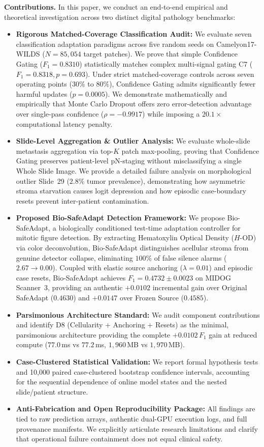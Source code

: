 \documentclass[conference]{IEEEtran}
\begin{document}
\textbf{Contributions.} In this paper, we conduct an end-to-end empirical and theoretical investigation across two distinct digital pathology benchmarks:
\begin{itemize}
    \item \textbf{Rigorous Matched-Coverage Classification Audit:} We evaluate seven classification adaptation paradigms across five random seeds on Camelyon17-WILDS ($N=85{,}054$ target patches). We prove that simple Confidence Gating ($F_1 = 0.8310$) statistically matches complex multi-signal gating C7 ($F_1 = 0.8318, p=0.693$). Under strict matched-coverage controls across seven operating points ($30\%$ to $80\%$), Confidence Gating admits significantly fewer harmful updates ($p=0.0005$). We demonstrate mathematically and empirically that Monte Carlo Dropout offers zero error-detection advantage over single-pass confidence ($\rho = -0.9917$) while imposing a $20.1\times$ computational latency penalty.
    \item \textbf{Slide-Level Aggregation \& Outlier Analysis:} We evaluate whole-slide metastasis aggregation via top-$K$ patch max-pooling, proving that Confidence Gating preserves patient-level pN-staging without misclassifying a single Whole Slide Image. We provide a detailed failure analysis on morphological outlier Slide~29 ($2.8\%$ tumor prevalence), demonstrating how asymmetric stroma starvation causes logit depression and how episodic case-boundary resets prevent inter-patient contamination.
    \item \textbf{Proposed Bio-SafeAdapt Detection Framework:} We propose Bio-SafeAdapt, a biologically conditioned test-time adaptation controller for mitotic figure detection. By extracting Hematoxylin Optical Density ($H\text{-OD}$) via color deconvolution, Bio-SafeAdapt distinguishes acellular stroma from genuine detector collapse, eliminating $100\%$ of false silence alarms ($2.67 \to 0.00$). Coupled with elastic source anchoring ($\lambda = 0.01$) and episodic case resets, Bio-SafeAdapt achieves $F_1 = 0.4732 \pm 0.0023$ on MIDOG Scanner~3, providing an authentic $+0.0102$ incremental gain over Original SafeAdapt ($0.4630$) and $+0.0147$ over Frozen Source ($0.4585$).
    \item \textbf{Parsimonious Architecture Standard:} We audit component contributions and identify D8 (Cellularity + Anchoring + Resets) as the minimal, parsimonious architecture providing the complete $+0.0102$\,$F_1$ gain at reduced compute ($77.0$\,ms vs $77.2$\,ms, $1{,}960$\,MB vs $1{,}970$\,MB).
    \item \textbf{Case-Clustered Statistical Validation:} We report formal hypothesis tests and 10,000 paired case-clustered bootstrap confidence intervals, accounting for the sequential dependence of online model states and the nested slide/patient structure.
    \item \textbf{Anti-Fabrication and Open Reproducibility Package:} All findings are tied to raw prediction arrays, authentic dual-GPU execution logs, and full provenance manifests. We explicitly articulate research limitations and clarify that operational failure containment does not equal clinical safety.
\end{itemize}
\end{document}
